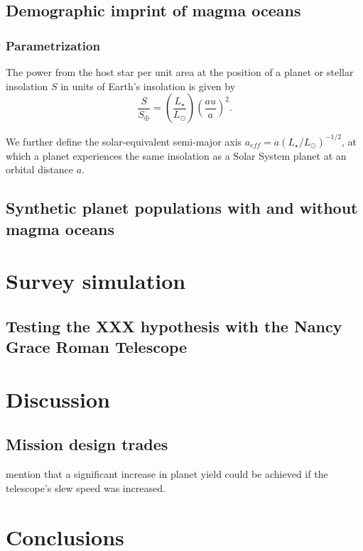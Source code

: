 \documentclass[twocolumn]{aastex631}
\begin{document}
\subsection{Demographic imprint of magma oceans}

\subsubsection{Parametrization}

\begin{note}
The power from the host star per unit area at the position of a planet or stellar insolation $S$ in units of Earth's insolation is given by
    \begin{equation}
        \frac{S}{S_\oplus} = \left(\frac{L_\star}{L_\odot}\right) \left(\frac{au}{a}\right)^2 .
    \end{equation}

We further define the solar-equivalent semi-major axis $a_{eff} = a (L_\star/L_\odot)^{-1/2}$, at which a planet experiences the same insolation as a Solar System planet at an orbital distance $a$.
\end{note}

\subsection{Synthetic planet populations with and without magma oceans}


\section{Survey simulation}

\subsection{Testing the XXX hypothesis with the Nancy Grace Roman Telescope}



\section{Discussion}

\subsection{Mission design trades}\label{sec:mission-design-trades}
\citet{Penny2019} mention that a significant increase in planet yield could be achieved if the telescope's slew speed was increased.

\section{Conclusions}




\end{document}
